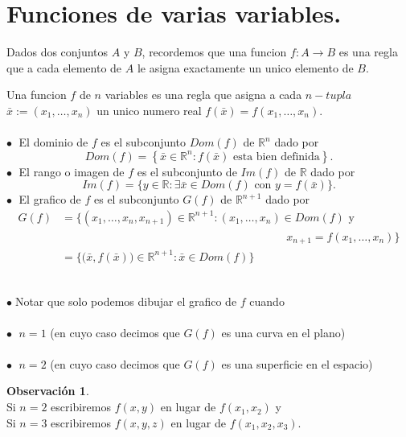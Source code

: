 \documentclass{article}
\theoremstyle{definition}
\newtheorem*{obs}{Observación}
\theoremstyle{remark}
\newcommand\bl{$\bullet\;$}
\begin{document}
\section{Funciones de varias variables.}
Dados dos conjuntos $A$ y $B$, recordemos que una funcion $f: A \to B$ es una regla que a cada elemento de $A$ le asigna exactamente un unico elemento de $B$. 
\begin{defi}
  Una funcion $f$ de $n$ variables es una regla que asigna a cada $n-tupla$ $\bar{x}:= (x_1, \dots , x_n)$ un unico numero real $f(\bar{x})=f(x_1,\dots,x_n)$. \\\\
   \textcolor{rojop2}{\bl} El dominio de $f$ es el subconjunto $Dom(f)$ de $\mathbb{R}^n$ dado por \[
   Dom(f)=\left\{\bar{x} \in \mathbb{R}^n : f(\bar{x}) \text{ esta bien definida}\right\}. \]  
     \textcolor{rojop2}{\bl} El rango o imagen de $f$ es el subconjunto de $Im(f)$ de $\mathbb{R}$ dado por \[ 
       Im(f)=\big\{y \in \mathbb{R} : \exists \bar{x} \in Dom(f) \text{ con } y=f(\bar{x})\big\}.
     \]
     \textcolor{rojop2}{\bl} El grafico de $f$ es el subconjunto $G(f)$ de $\mathbb{R}^{n+1}$ dado por \[ 
       \begin{array}{ll}
       G(f) & = \big\{ (x_1,\dots,x_n,x_{n+1}) \in \mathbb{R}^{n+1} : (x_1,\dots,x_n) \in Dom(f) \text{ y } \\ & \quad \quad \quad \quad \quad \quad \quad \quad \quad \quad \quad \quad \quad \quad \quad \quad \quad \quad \quad \quad  x_{n+1} = f(x_1,\dots,x_n) \big\} \\
              & = \big\{\big(\bar{x},f(\bar{x})\big) \in \mathbb{R}^{n+1} : \bar{x} \in Dom(f)\big\}
       \end{array}
     \]
\end{defi} \; \\
\bl Notar que solo podemos dibujar el grafico de $f$ cuando \\\\
\quad \quad \textcolor{verdep2}{\bl} $n=1$ \quad \big(en cuyo caso decimos que $G(f)$ es una curva en el plano\big) \\\\
\quad \quad \textcolor{verdep2}{\bl} $n=2$ \quad \big(en cuyo caso decimos que $G(f)$ es una superficie en el espacio\big)
\begin{obs}
  \; \\
  \phantom{\bl} Si $n=2$ escribiremos $f(x,y)$ en lugar de $f(x_1,x_2)$ y \\
  \phantom{\bl} Si $n=3$ escribiremos $f(x,y,z)$ en lugar de $f(x_1,x_2,x_3)$.
\end{obs}
\end{document}
